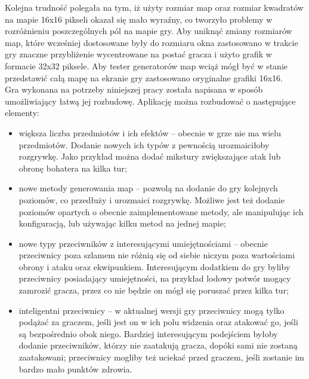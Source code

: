 \documentclass[12pt,twoside]{article}
\begin{document}
Kolejna trudność polegała na tym, iż użyty rozmiar map oraz rozmiar kwadratów na mapie 16x16 pikseli okazał się mało wyraźny, co tworzyło problemy w rozróżnieniu poszczególnych pól na mapie gry. Aby uniknąć zmiany rozmiarów map, które wcześniej dostosowane były do rozmiaru okna zastosowano w trakcie gry znaczne przybliżenie wycentrowane na postać gracza i użyto grafik w formacie 32x32 piksele. Aby tester generatorów map wciąż mógł być w stanie przedstawić całą mapę na ekranie gry zastosowano oryginalne grafiki 16x16. \\


Gra wykonana na potrzeby niniejszej pracy została napisana w sposób umożliwiający łatwą jej rozbudowę. Aplikację można rozbudować o następujące elementy:
\begin{itemize}
	\item większa liczba przedmiotów i ich efektów -- obecnie w grze nie ma wielu przedmiotów. Dodanie nowych ich typów z pewnością urozmaiciłoby rozgrywkę. Jako przykład można dodać mikstury zwiększające atak lub obronę bohatera na kilka tur;
	\item nowe metody generowania map -- pozwolą na dodanie do gry kolejnych poziomów, co przedłuży i urozmaici rozgrywkę. Możliwe jest też dodanie poziomów opartych o obecnie zaimplementowane metody, ale manipulując ich konfiguracją, lub używając kilku metod na jednej mapie;
	\item nowe typy przeciwników z interesującymi umiejętnościami -- obecnie przeciwnicy poza szlamem nie różnią się od siebie niczym poza wartościami obrony i ataku oraz ekwipunkiem. Interesującym dodatkiem do gry byliby przeciwnicy posiadający umiejętności, na przykład lodowy potwór mogący zamrozić gracza, przez co nie będzie on mógł się poruszać przez kilka tur;
	\item inteligentni przeciwnicy -- w aktualnej wersji gry przeciwnicy mogą tylko podążać za graczem, jeśli jest on w ich polu widzenia oraz atakować go, jeśli są bezpośrednio obok niego. Bardziej interesującym podejściem byłoby dodanie przeciwników, którzy nie zaatakują gracza, dopóki sami nie zostaną zaatakowani; przeciwnicy mogliby też uciekać przed graczem, jeśli zostanie im bardzo mało punktów zdrowia.
\end{itemize}


\clearpage



\end{document}

